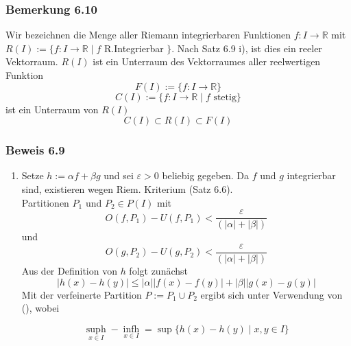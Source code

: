 \subsubsection*{Bemerkung 6.10}
Wir bezeichnen die Menge aller Riemann integrierbaren Funktionen $f:I\rightarrow \mathbb{R}$ mit $R(I):=\{f:I\rightarrow\mathbb{R}\mid f$ R.Integrierbar $\}$. Nach Satz 6.9 i), ist dies ein reeler Vektorraum. $R(I)$ ist ein Unterraum des Vektorraumes aller reelwertigen Funktion $$F(I):=\{ f:I\rightarrow \mathbb{R}\}$$$$C(I):=\{ f:I\rightarrow\mathbb{R}\mid f \text{ stetig}\}$$
ist ein Unterraum von $R(I)$ $$C(I)\subset R(I)\subset F(I)$$
\subsubsection*{Beweis 6.9}
\begin{enumerate}
\item Setze $h:=\alpha f + \beta g$ und sei $\varepsilon>0$ beliebig gegeben. Da $f$ und $g$ integrierbar sind, existieren wegen Riem. Kriterium (Satz 6.6).\\ Partitionen $P_1$ und $P_2 \in P(I)$ mit \[O(f,{P_1}) - U(f,{P_1}) < \frac{\varepsilon }{{(\left| \alpha  \right| + \left| \beta  \right|)}}\] und  \[O(g,{P_2}) - U(g,{P_2}) < \frac{\varepsilon }{{(\left| \alpha  \right| + \left| \beta  \right|)}}\] Aus der Definition von $h$ folgt zunächst \[\left| {h(x) - h(y)} \right| \le \left| \alpha  \right|\left| {f(x) - f(y)} \right| + \left| \beta  \right|\left| {g(x) - g(y)} \right|\] Mit der verfeinerte Partition $P:=P_1\cup P_2$ ergibt sich unter Verwendung von (\textasteriskcentered), wobei 


\[
\mathop {\sup h(x)}\limits_{x \in I}  - \mathop {\inf h(x)}\limits_{x \in I}  = \sup \{ h(x) - h(y)\mid x,y \in I\}\tag{\textasteriskcentered}
\] 






\end{enumerate}
